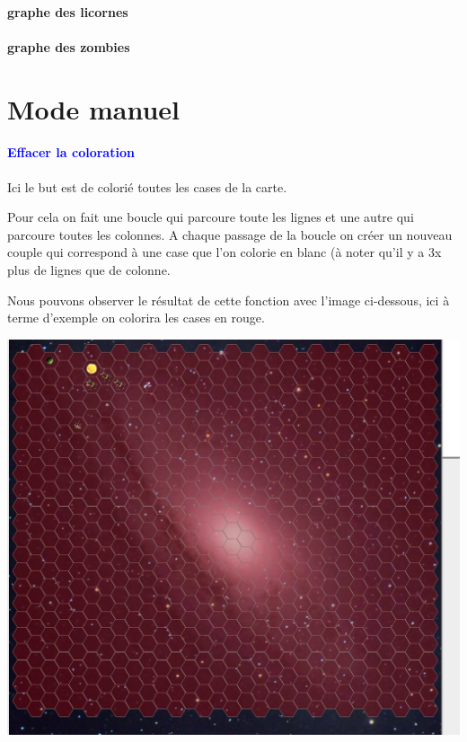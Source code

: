\documentclass{report}
\begin{document}
			
			
			
			
			
			
			
			
			\paragraph{graphe des licornes}
			\paragraph{graphe des zombies}
		\section{Mode manuel}
			      \paragraph{\textcolor{blue}{Effacer la coloration}} 
      Ici le but est de colorié toutes les cases de la carte. 
       
    Pour cela on fait une boucle qui parcoure toute les lignes  et une autre qui parcoure toutes les colonnes. A chaque passage de la boucle on créer un nouveau couple qui correspond à une case que l'on colorie en blanc (à noter qu'il y a 3x plus de lignes que de colonne.      
       
      Nous pouvons observer le résultat de cette fonction avec l'image ci-dessous, ici à terme d'exemple on colorira les cases en rouge. 
       
      \begin{center}  
          \includegraphics[scale=0.30]{Images/effaceColoration.png}
      \end{center} 
       
\end{document}
